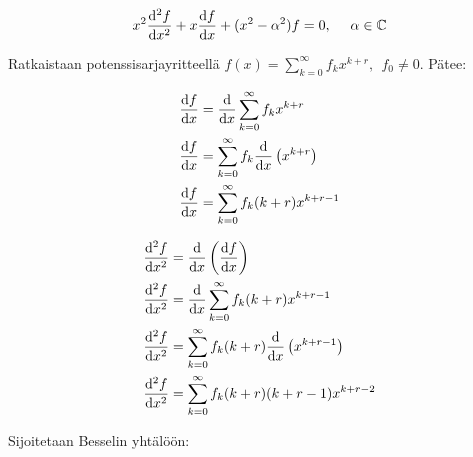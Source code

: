 \documentclass[../johdoksia.tex]{subfiles}
\begin{document}
	\begin{equation}
		x^2\odv{^2f}{x^2} + x\odv{f}{x} + (x^2 - \alpha^2)f = 0, \ \ \ \ \alpha\in\mathbb{C}
	\end{equation}
	
	Ratkaistaan potenssisarjayritteellä $f(x) = \sum_{k = 0}^{\infty}f_kx^{k + r}, \ \ f_0 \neq 0$. Pätee:
	
	\begin{align*}
		\odv{f}{x} &= \odv{}{x}\sum_{k = 0}^{\infty}f_kx^{k + r} \\
		\odv{f}{x} &= \sum_{k = 0}^{\infty}f_k\odv{}{x}\left(x^{k + r}\right) \\
		\odv{f}{x} &= \sum_{k = 0}^{\infty}f_k(k + r)x^{k + r - 1}
	\end{align*}
	
	\begin{align*}
		\odv{^2f}{x^2} &= \odv{}{x}\left(\odv{f}{x}\right) \\
		\odv{^2f}{x^2} &= \odv{}{x}\sum_{k = 0}^{\infty}f_k(k + r)x^{k + r - 1} \\
		\odv{^2f}{x^2} &= \sum_{k = 0}^{\infty}f_k(k + r)\odv{}{x}\left(x^{k + r - 1}\right) \\
		\odv{^2f}{x^2} &= \sum_{k = 0}^{\infty}f_k(k + r)(k + r - 1)x^{k + r - 2}
	\end{align*}
	
	Sijoitetaan Besselin yhtälöön:
	
\end{document}
